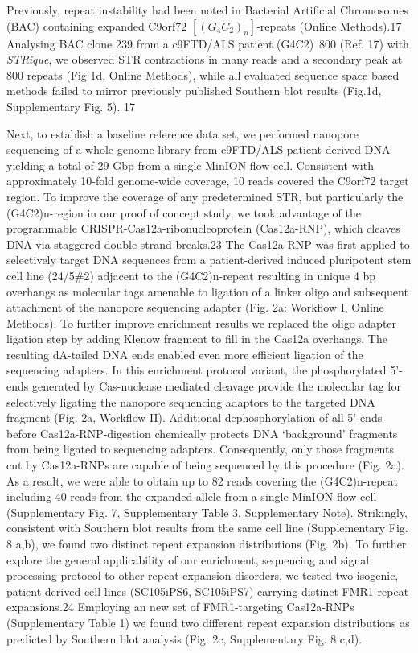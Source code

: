 Previously, repeat instability had been noted in Bacterial Artificial Chromosomes (BAC) containing expanded C9orf72 $ [(G_{4}C_{2})_{n}] $-repeats (Online Methods).17 Analysing BAC clone 239 from a c9FTD/ALS patient (G4C2)~800 (Ref. 17) with \textit{STRique}, we observed STR contractions in many reads and a secondary peak at 800 repeats (Fig 1d, Online Methods), while all evaluated sequence space based methods failed to mirror previously published Southern blot results (Fig.1d, Supplementary Fig. 5). 17


Next, to establish a baseline reference data set, we performed nanopore sequencing of a whole genome library from c9FTD/ALS patient-derived DNA yielding a total of 29 Gbp from a single MinION flow cell. Consistent with approximately 10-fold genome-wide coverage, 10 reads covered the C9orf72 target region. To improve the coverage of any predetermined STR, but particularly the (G4C2)n-region in our proof of concept study, we took advantage of the programmable CRISPR-Cas12a-ribonucleoprotein (Cas12a-RNP), which cleaves DNA via staggered double-strand breaks.23 The Cas12a-RNP was first applied to selectively target DNA sequences from a patient-derived induced pluripotent stem cell line (24/5\#2) adjacent to the (G4C2)n-repeat resulting in unique 4 bp overhangs as molecular tags amenable to ligation of a linker oligo and subsequent attachment of the nanopore sequencing adapter (Fig. 2a: Workflow I, Online Methods). To further improve enrichment results we replaced the oligo adapter ligation step by adding Klenow fragment to fill in the Cas12a overhangs. The resulting dA-tailed DNA ends enabled even more efficient ligation of the sequencing adapters. In this enrichment protocol variant, the phosphorylated 5’-ends generated by Cas-nuclease mediated cleavage provide the molecular tag for selectively ligating the nanopore sequencing adaptors to the targeted DNA fragment (Fig. 2a, Workflow II).
Additional dephosphorylation of all 5’-ends before Cas12a-RNP-digestion chemically protects DNA ‘background’ fragments from being ligated to sequencing adapters. Consequently, only those fragments cut by Cas12a-RNPs are capable of being sequenced by this procedure (Fig. 2a). As a result, we were able to obtain up to 82 reads covering the (G4C2)n-repeat including 40 reads from the expanded allele from a single MinION flow cell (Supplementary Fig. 7, Supplementary Table 3, Supplementary Note). Strikingly, consistent with Southern blot results from the same cell line (Supplementary Fig. 8 a,b), we found two distinct repeat expansion distributions (Fig. 2b). To further explore the general applicability of our enrichment, sequencing and signal processing protocol to other repeat expansion disorders, we tested two isogenic, patient-derived cell lines (SC105iPS6, SC105iPS7) carrying distinct FMR1-repeat expansions.24 Employing an new set of FMR1-targeting Cas12a-RNPs (Supplementary Table 1) we found two different repeat expansion distributions as predicted by Southern blot analysis (Fig. 2c, Supplementary Fig. 8 c,d).
